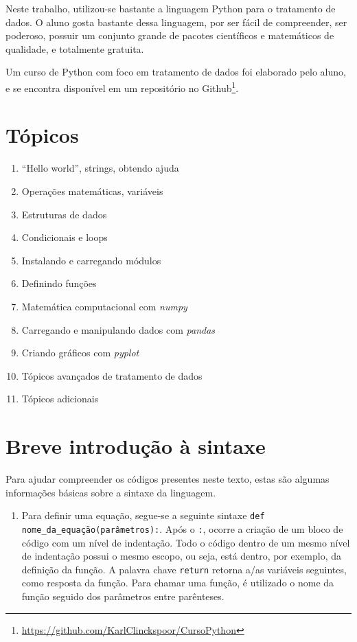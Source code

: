 \begin{apendicesenv}
Neste trabalho, utilizou-se bastante a linguagem Python para o tratamento de dados. O aluno gosta bastante dessa linguagem, por ser fácil de compreender, ser poderoso, possuir um conjunto grande de pacotes científicos e matemáticos de qualidade, e totalmente gratuita. 

Um curso de Python com foco em tratamento de dados foi elaborado pelo aluno, e se encontra disponível em um repositório no Github\footnote{\href{https://github.com/KarlClinckspoor/CursoPython}{https://github.com/KarlClinckspoor/CursoPython}}. 

\section{Tópicos}

	\begin{enumerate}[noitemsep]
		\item ``Hello world'', strings, obtendo ajuda
		\item Operações matemáticas, variáveis
		\item Estruturas de dados
		\item Condicionais e loops
		\item Instalando e carregando módulos
		\item Definindo funções
		\item Matemática computacional com \emph{numpy}
		\item Carregando e manipulando dados com \emph{pandas}
		\item Criando gráficos com \emph{pyplot}
		\item Tópicos avançados de tratamento de dados
		\item Tópicos adicionais
	\end{enumerate}

\section{Breve introdução à sintaxe}

Para ajudar compreender os códigos presentes neste texto, estas são algumas informações básicas sobre a sintaxe da linguagem.

\begin{enumerate}
	\item 	Para definir uma equação, segue-se a seguinte sintaxe \texttt{def nome_da_equação(parâmetros):}. Após o \texttt{:}, ocorre a criação de um bloco de código com um nível de indentação. Todo o código dentro de um mesmo nível de indentação possui o mesmo escopo, ou seja, está dentro, por exemplo, da definição da função. A palavra chave \texttt{return} retorna a/as variáveis seguintes, como resposta da função. Para chamar uma função, é utilizado o nome da função seguido dos parâmetros entre parênteses.
	

\end{enumerate}
\end{apendicesenv}
